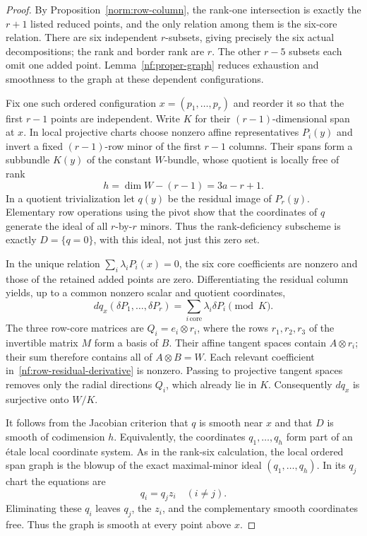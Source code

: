 \begin{proof}
By Proposition~\ref{norm:row-column}, the rank-one intersection is
exactly the $r+1$ listed reduced points, and the only relation among
them is the six-core relation. There are six independent
$r$-subsets, giving precisely the six actual decompositions; the
rank and border rank are $r$. The other $r-5$ subsets each omit
one added point. Lemma~\ref{nf:proper-graph} reduces exhaustion and
smoothness to the graph at these dependent configurations.

Fix one such ordered configuration $x=(p_1,\ldots,p_r)$ and reorder
it so that the first $r-1$ points are independent. Write $K$ for
their $(r-1)$-dimensional span at $x$. In local projective charts
choose nonzero affine representatives $P_i(y)$ and invert a fixed
$(r-1)$-row minor of the first $r-1$ columns. Their spans form a
subbundle $K(y)$ of the constant $W$-bundle, whose quotient is locally
free of rank
\[
 h=\dim W-(r-1)=3a-r+1.
\]
In a quotient trivialization let $q(y)$ be the residual image of
$P_r(y)$. Elementary row operations using the pivot show that the
coordinates of $q$ generate the ideal of all $r$-by-$r$ minors.
Thus the rank-deficiency subscheme is exactly $D=\{q=0\}$,
with this ideal, not just this zero set.

In the unique relation $\sum_i\lambda_iP_i(x)=0$, the six core
coefficients are nonzero and those of the retained added points are
zero. Differentiating the residual column yields, up to a common
nonzero scalar and quotient coordinates,
\begin{equation}\label{nf:row-residual-derivative}
 dq_x(\delta P_1,\ldots,\delta P_r)
   =\sum_{i\,\text{core}}\lambda_i\delta P_i\pmod K.
\end{equation}
The three row-core matrices are $Q_i=e_i\otimes r_i$, where the
rows $r_1,r_2,r_3$ of the invertible matrix $M$ form a basis of $B$.
Their affine tangent spaces contain $A\otimes r_i$; their sum
therefore contains all of $A\otimes B=W$. Each relevant coefficient
in~\eqref{nf:row-residual-derivative} is nonzero. Passing to
projective tangent spaces removes only the radial directions $Q_i$,
which already lie in $K$. Consequently $dq_x$ is surjective onto
$W/K$.

It follows from the Jacobian criterion that $q$ is smooth near $x$
and that $D$ is smooth of codimension $h$. Equivalently, the
coordinates $q_1,\ldots,q_h$ form part of an \'etale local coordinate
system. As in the rank-six calculation, the local ordered span graph
is the blowup of the exact maximal-minor ideal $(q_1,\ldots,q_h)$.
In its $q_j$ chart the equations are
\[
 q_i=q_jz_i\quad(i\ne j).
\]
Eliminating these $q_i$ leaves $q_j$, the $z_i$, and the complementary
smooth coordinates free. Thus the graph is smooth at every point
above $x$.


\end{proof}
